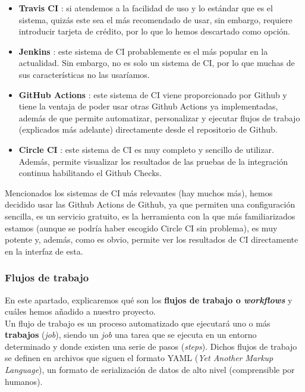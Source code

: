     \begin{itemize}
        \item \textbf{Travis CI} \cite{travis-ci}: si atendemos a la facilidad de uso y lo
        estándar que es el sistema, quizás este sea el más recomendado de usar, sin embargo,
        requiere introducir tarjeta de crédito, por lo que lo hemos descartado como opción.
        \item \textbf{Jenkins} \cite{jenkins}: este sistema de CI probablemente es el más
        popular en la actualidad. Sin embargo, no es solo un sistema de CI, por lo
        que muchas de sus características no las usaríamos.
        \item \textbf{GitHub Actions} \cite{github-actions}: este sistema de CI viene
        proporcionado por Github y tiene la ventaja de poder usar otras Github Actions ya
        implementadas, además de que permite automatizar, personalizar y ejecutar flujos de
        trabajo (explicados más adelante) directamente desde el repositorio de Github.
        \item \textbf{Circle CI} \cite{circle-ci}: este sistema de CI es muy completo y
        sencillo de utilizar. Además, permite visualizar los resultados de las pruebas de la
        integración continua habilitando el Github Checks.
    \end{itemize}

    Mencionados los sistemas de CI más relevantes (hay muchos más), hemos decidido usar las
    Github Actions de Github, ya que permiten una configuración sencilla, es un servicio
    gratuito, es la herramienta con la que más familiarizados estamos (aunque se podría haber
    escogido Circle CI sin problema), es muy potente y, además, como es obvio, permite ver los
    resultados de CI directamente en la interfaz de esta.

\subsubsection{Flujos de trabajo}
En este apartado, explicaremos qué son los \textbf{flujos de trabajo o \textit{workflows}} y
cuáles hemos añadido a nuestro proyecto.\\

Un flujo de trabajo es un proceso automatizado que ejecutará uno o más \textbf{trabajos}
(\textit{job}), siendo un \textit{job} una tarea que se ejecuta en un entorno determinado y
donde existen una serie de pasos (\textit{steps}). Dichos flujos de trabajo se definen en
archivos que siguen el formato YAML (\textit{Yet Another Markup Language}), un formato de
serialización de datos de alto nivel (comprensible por humanos).\\

